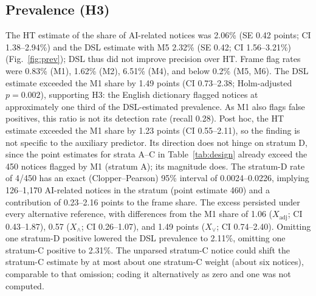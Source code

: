 \documentclass[runningheads]{llncs}
\begin{document}
\subsection{Prevalence (H3)}
The HT estimate of the share of AI-related notices was 2.06\% (SE 0.42 points; CI 1.38--2.94\%) and the DSL estimate with M5 2.32\% (SE 0.42; CI 1.56--3.21\%) (Fig.~\ref{fig:prev}); DSL thus did not improve precision over HT. Frame flag rates were 0.83\% (M1), 1.62\% (M2), 6.51\% (M4), and below 0.2\% (M5, M6). The DSL estimate exceeded the M1 share by 1.49 points (CI 0.73--2.38; Holm-adjusted $p=0.002$), supporting H3: the English dictionary flagged notices at approximately one third of the DSL-estimated prevalence. As M1 also flags false positives, this ratio is not its detection rate (recall 0.28). Post hoc, the HT estimate exceeded the M1 share by 1.23 points (CI 0.55--2.11), so the finding is not specific to the auxiliary predictor. Its direction does not hinge on stratum D, since the point estimates for strata A--C in Table~\ref{tab:design} already exceed the 450 notices flagged by M1 (stratum A); its magnitude does. The stratum-D rate of 4/450 has an exact (Clopper--Pearson) 95\% interval of 0.0024--0.0226, implying 126--1,170 AI-related notices in the stratum (point estimate 460) and a contribution of 0.23--2.16 points to the frame share. The excess persisted under every alternative reference, with differences from the M1 share of 1.06 ($X_{\mathrm{adj}}$; CI 0.43--1.87), 0.57 ($X_\wedge$; CI 0.26--1.07), and 1.49 points ($X_\vee$; CI 0.74--2.40). Omitting one stratum-D positive lowered the DSL prevalence to 2.11\%, omitting one stratum-C positive to 2.31\%. The unparsed stratum-C notice could shift the stratum-C estimate by at most about one stratum-C weight (about six notices), comparable to that omission; coding it alternatively as zero and one was not computed.
\end{document}
